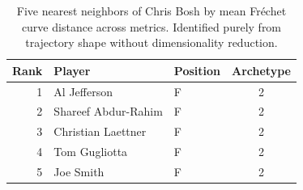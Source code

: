 \begin{table}[htbp]
  \centering\small
  \begin{tabular}{rllc}
    \toprule
    Rank & Player & Position & Archetype \\
    \midrule
    1 & Al Jefferson & F & 2 \\
    2 & Shareef Abdur-Rahim & F & 2 \\
    3 & Christian Laettner & F & 2 \\
    4 & Tom Gugliotta & F & 2 \\
    5 & Joe Smith & F & 2 \\
    \bottomrule
  \end{tabular}
  \caption{Five nearest neighbors of Chris Bosh by mean Fr\'{e}chet curve distance across metrics. Identified purely from trajectory shape without dimensionality reduction.}
  \label{tab:Chris_Bosh_frechet_curve_neighbors}
\end{table}

